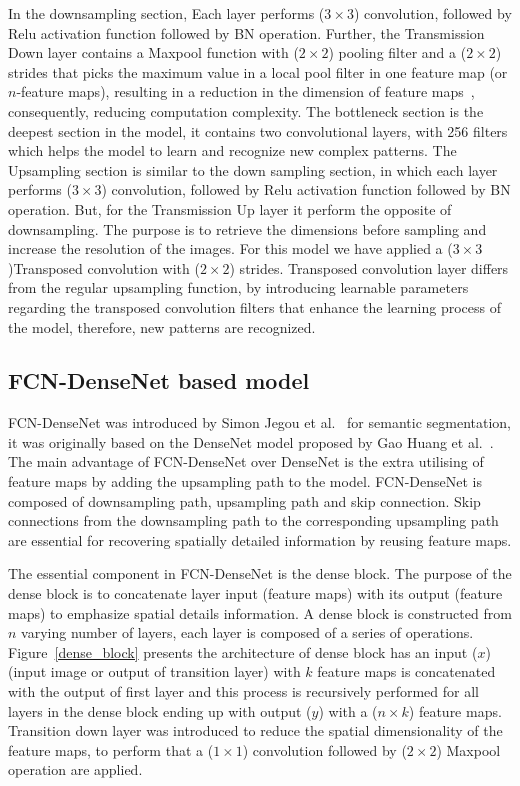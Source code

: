 \documentclass[preprint,9pt]{elsarticle}
\begin{document}
In the downsampling section,
Each layer performs (\(3\times3\)) convolution, followed by Relu activation function followed by BN operation.
Further, the Transmission Down layer contains a Maxpool function with (\(2\times2\)) pooling filter and a (\(2\times2\)) strides that picks the maximum value in a local pool filter in one feature map (or \(n\)-feature maps), resulting in a reduction in the dimension of feature maps~\cite{Lecun2015}, consequently, reducing computation complexity.
The bottleneck section is the deepest section in the model, it contains two convolutional layers, with 256 filters which helps the model to learn and recognize new complex patterns.
The Upsampling section is similar to the down sampling section, in which each layer  performs (\(3\times3\)) convolution, followed by Relu activation function followed by BN operation. But, for the Transmission Up layer it perform the opposite of downsampling.
The purpose is to retrieve the dimensions before sampling and increase the resolution of the images. 
For this model we have applied a (\(3\times3\))Transposed convolution with (\(2\times2\)) strides.
Transposed convolution layer differs from the regular upsampling function, by introducing learnable parameters regarding the transposed convolution filters that enhance the learning process of the model, therefore, new patterns are recognized. 


\subsection{FCN-DenseNet based model}
FCN-DenseNet was introduced by Simon Jegou et al.~\cite{Jegou} for semantic segmentation, it was originally based on the DenseNet model proposed by Gao Huang et al.~\cite{Huang}. 
The main advantage of FCN-DenseNet over DenseNet is the extra utilising of feature maps by adding the upsampling path to the model.
FCN-DenseNet is composed of downsampling path, upsampling path and skip connection.
Skip connections from the downsampling path to the corresponding upsampling path are essential for recovering spatially detailed information by reusing feature maps.
 
The essential component in FCN-DenseNet is the dense block.
The purpose of the dense block is to concatenate layer input (feature maps) with its output (feature maps) to emphasize spatial details information.
A dense block is constructed from \(n\) varying number of layers, each layer is composed of a series of operations.
Figure~\ref{dense_block} presents the architecture of dense block has an input (\(x\)) (input image or output of transition layer) with \(k\) feature maps is concatenated with the output of first layer and this process is recursively performed for all layers in the dense block ending up with output (\(y\)) with a (\(n\times k\)) feature maps. 
Transition down layer was introduced to reduce the spatial dimensionality of the feature maps, to perform that a (\(1\times 1\))  convolution followed by (\(2\times2\)) Maxpool operation are applied. 
\end{document}
